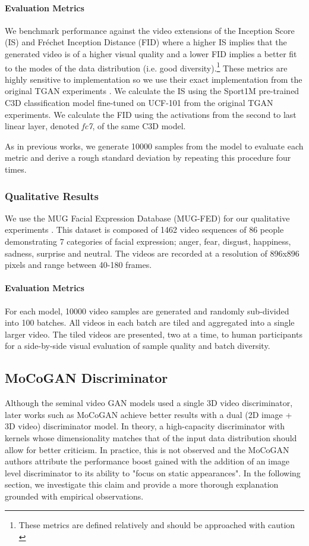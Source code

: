 \documentclass[a4paper,fleqn]{cas-sc}
\begin{document}
\paragraph{Evaluation Metrics} We benchmark performance against the video extensions of the Inception Score (IS) and Fr\'echet Inception Distance (FID) where a higher IS implies that the generated video is of a higher visual quality and a lower FID implies a better fit to the modes of the data distribution (i.e. good diversity).\footnote{These metrics are defined relatively and should be approached with caution \cite{barratt2018note}} These metrics are highly sensitive to implementation so we use their exact implementation from the original TGAN experiments \cite{SaitoMS17temporal}. We calculate the IS using the Sport1M pre-trained C3D classification model fine-tuned on UCF-101 from the original TGAN experiments. We calculate the FID using the activations from the second to last linear layer, denoted \textit{fc7}, of the same C3D model.
 
As in previous works, we generate 10000 samples from the model to evaluate each metric and derive a rough standard deviation by repeating this procedure four times. 

\subsubsection{Qualitative Results}
We use the MUG Facial Expression Database (MUG-FED) for our qualitative experiments \cite{AifantiPD10mug}. This dataset is composed of 1462 video sequences of 86 people demonstrating 7 categories of facial expression; anger, fear, disgust, happiness, sadness, surprise and neutral. The videos are recorded at a resolution of 896x896 pixels and range between 40-180 frames.

\paragraph{Evaluation Metrics} For each model, 10000 video samples are generated and randomly sub-divided into 100 batches. All videos in each batch are tiled and aggregated into a single larger video. The tiled videos are presented, two at a time, to human participants for a side-by-side visual evaluation of sample quality and batch diversity.


\subsection{MoCoGAN Discriminator}
\label{sec:mocogan}
Although the seminal video GAN models used a single 3D video discriminator, later works such as MoCoGAN achieve better results with a dual (2D image + 3D video) discriminator model. In theory, a high-capacity discriminator with kernels whose dimensionality matches that of the input data distribution should allow for better criticism. In practice, this is not observed and the MoCoGAN authors attribute the performance boost gained with the addition of an image level discriminator to its ability to "focus on static appearances". In the following section, we investigate this claim and provide a more thorough explanation grounded with empirical observations. 
\end{document}
